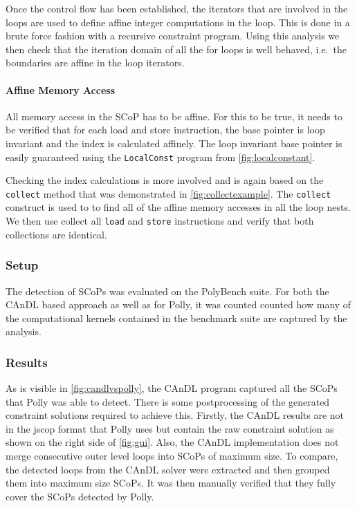     Once the control flow has been established, the iterators that are
    involved in the loops are used to define affine integer computations in the
    loop.
    This is done in a brute force fashion with a recursive constraint program.
    Using this analysis we then check that the iteration domain of all the for
    loops is well behaved, i.e.\ the boundaries are affine in the loop
    iterators.

    \paragraph*{Affine Memory Access}
    All memory access in the SCoP has to be affine.
    For this to be true, it needs to be verified that for each load and store
    instruction, the base pointer is loop invariant and the index is calculated
    affinely.
    The loop invariant base pointer is easily guaranteed using the
    \texttt{LocalConst} program from \autoref{fig:localconstant}.

    Checking the index calculations is more involved and is again based on the
    \texttt{collect} method that was demonstrated in
    \autoref{fig:collectexample}.
    The \texttt{collect} construct is used to to find all of the affine memory
    accesses in all the loop nests.
    We then use collect all \texttt{load} and \texttt{store} instructions and
    verify that both collections are identical.

\subsubsection{Setup}

    The detection of SCoPs was evaluated on the PolyBench suite.
    For both the CAnDL based approach as well as for Polly, it was counted
    counted how many of the computational kernels contained in the benchmark
    suite are captured by the analysis.

\subsubsection{Results}

    As is visible in \autoref{fig:candlvspolly}, the CAnDL program captured all
    the SCoPs that Polly was able to detect.
    There is some postprocessing of the generated constraint solutions required
    to achieve this.
    Firstly, the CAnDL results are not in the jscop format that Polly uses but
    contain the raw constraint solution as shown on the right side of
    \autoref{fig:gui}.
    Also, the CAnDL implementation does not merge consecutive outer level loops
    into SCoPs of maximum size.
    To compare, the detected loops from the CAnDL solver were extracted and then
    grouped them into maximum size SCoPs.
    It was then manually verified that they fully cover the SCoPs detected by
    Polly.

